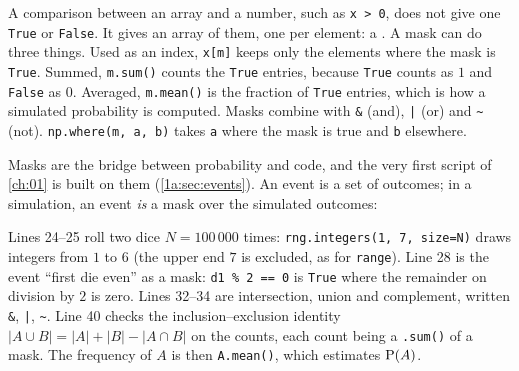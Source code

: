 A comparison between an array and a number, such as \texttt{x > 0}, does not give one \texttt{True} or \texttt{False}. It gives an array of them, one per element: a . A mask can do three things. Used as an index, \texttt{x[m]} keeps only the elements where the mask is \texttt{True}. Summed, \texttt{m.sum()} counts the \texttt{True} entries, because \texttt{True} counts as $1$ and \texttt{False} as $0$. Averaged, \texttt{m.mean()} is the fraction of \texttt{True} entries, which is how a simulated probability is computed. Masks combine with \texttt{\&} (and), \texttt{|} (or) and \texttt{\textasciitilde} (not). \texttt{np.where(m, a, b)} takes \texttt{a} where the mask is true and \texttt{b} elsewhere.


Masks are the bridge between probability and code, and the very first script of \cref{ch:01} is built on them (\cref{1a:sec:events}). An event is a set of outcomes; in a simulation, an event \emph{is} a mask over the simulated outcomes:


Lines 24--25 roll two dice $N=100\,000$ times: \texttt{rng.integers(1, 7, size=N)} draws integers from $1$ to $6$ (the upper end $7$ is excluded, as for \texttt{range}). Line 28 is the event ``first die even'' as a mask: \texttt{d1 \% 2 == 0} is \texttt{True} where the remainder on division by $2$ is zero. Lines 32--34 are intersection, union and complement, written \texttt{\&}, \texttt{|}, \texttt{\textasciitilde}. Line 40 checks the inclusion--exclusion identity $|A\cup B|=|A|+|B|-|A\cap B|$ on the counts, each count being a \texttt{.sum()} of a mask. The frequency of $A$ is then \texttt{A.mean()}, which estimates $\operatorname{P}(A)$.

